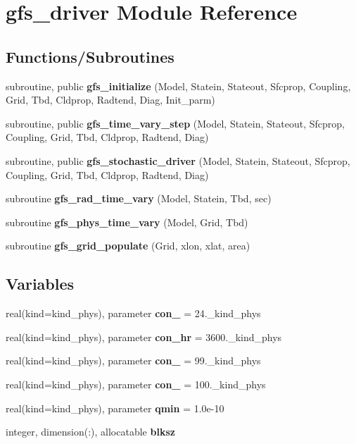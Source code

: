 \section{gfs\+\_\+driver Module Reference}
\label{namespacegfs__driver}
\subsection*{Functions/\+Subroutines}
\begin{DoxyCompactItemize}
\item 
subroutine, public \textbf{ gfs\+\_\+initialize} (Model, Statein, Stateout, Sfcprop, Coupling, Grid, Tbd, Cldprop, Radtend, Diag, Init\+\_\+parm)
\item 
subroutine, public \textbf{ gfs\+\_\+time\+\_\+vary\+\_\+step} (Model, Statein, Stateout, Sfcprop, Coupling, Grid, Tbd, Cldprop, Radtend, Diag)
\item 
subroutine, public \textbf{ gfs\+\_\+stochastic\+\_\+driver} (Model, Statein, Stateout, Sfcprop, Coupling, Grid, Tbd, Cldprop, Radtend, Diag)
\item 
subroutine \textbf{ gfs\+\_\+rad\+\_\+time\+\_\+vary} (Model, Statein, Tbd, sec)
\item 
subroutine \textbf{ gfs\+\_\+phys\+\_\+time\+\_\+vary} (Model, Grid, Tbd)
\item 
subroutine \textbf{ gfs\+\_\+grid\+\_\+populate} (Grid, xlon, xlat, area)
\end{DoxyCompactItemize}
\subsection*{Variables}
\begin{DoxyCompactItemize}
\item 
real(kind=kind\+\_\+phys), parameter \textbf{ con\+\_} = 24.\+\_\+kind\+\_\+phys
\item 
real(kind=kind\+\_\+phys), parameter \textbf{ con\+\_\+hr} = 3600.\+\_\+kind\+\_\+phys
\item 
real(kind=kind\+\_\+phys), parameter \textbf{ con\+\_} = 99.\+\_\+kind\+\_\+phys
\item 
real(kind=kind\+\_\+phys), parameter \textbf{ con\+\_} = 100.\+\_\+kind\+\_\+phys
\item 
real(kind=kind\+\_\+phys), parameter \textbf{ qmin} = 1.\+0e-\/10
\item 
integer, dimension(\+:), allocatable \textbf{ blksz}
\end{DoxyCompactItemize}


